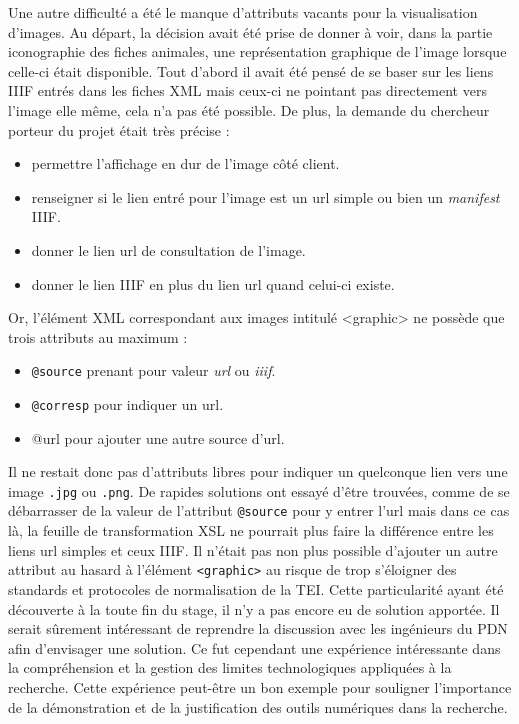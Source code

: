 \documentclass[a4paper,12pt,twoside]{book}
\begin{document}
Une autre difficulté a été le manque d'attributs vacants pour la visualisation d'images. Au départ, la décision avait été prise de donner à voir, dans la partie iconographie des fiches animales, une représentation graphique de l'image lorsque celle-ci était disponible. Tout d'abord il avait été pensé de se baser sur les liens IIIF entrés dans les fiches XML mais ceux-ci ne pointant pas directement vers l'image elle même, cela n'a pas été possible. De plus, la demande du chercheur porteur du projet était très précise :
\begin{itemize}
    \item permettre l'affichage en dur de l'image côté client.
    \item renseigner si le lien entré pour l'image est un url simple ou bien un \textit{manifest} \acrshort{IIIF}.
    \item donner le lien url de consultation de l'image.
    \item donner le lien \acrshort{IIIF} en plus du lien url quand celui-ci existe.
\end{itemize}
Or, l'élément XML correspondant aux images intitulé <graphic> ne possède que trois attributs au maximum :
\begin{itemize}
    \item \texttt{@source} prenant pour valeur \textit{url} ou \textit{iiif}.
    \item \texttt{@corresp} pour indiquer un url.
    \item @url pour ajouter une autre source d'url.
\end{itemize}
Il ne restait donc pas d'attributs libres pour indiquer un quelconque lien vers une image \texttt{.jpg} ou \texttt{.png}. De rapides solutions ont essayé d'être trouvées, comme de se débarrasser de la valeur de l'attribut \texttt{@source} pour y entrer l'url mais dans ce cas là, la feuille de transformation \acrshort{XSL} ne pourrait plus faire la différence entre les liens url simples et ceux \acrshort{IIIF}. Il n'était pas non plus possible d'ajouter un autre attribut au hasard à l'élément \texttt{<graphic>} au risque de trop s'éloigner des standards et protocoles de normalisation de la TEI. Cette particularité ayant été découverte à la toute fin du stage, il n'y a pas encore eu de solution apportée. Il serait sûrement intéressant de reprendre la discussion avec les ingénieurs du \acrshort{PDN} afin d'envisager une solution. Ce fut cependant une expérience intéressante dans la compréhension et la gestion des limites technologiques appliquées à la recherche. Cette expérience peut-être un bon exemple pour souligner l'importance de la démonstration et de la justification des outils numériques dans la recherche.
\end{document}
